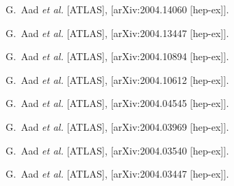\begin{thebibliography}{9}
G.~Aad \textit{et al.} [ATLAS],
[arXiv:2004.14060 [hep-ex]].

G.~Aad \textit{et al.} [ATLAS],
[arXiv:2004.13447 [hep-ex]].

G.~Aad \textit{et al.} [ATLAS],
[arXiv:2004.10894 [hep-ex]].

G.~Aad \textit{et al.} [ATLAS],
[arXiv:2004.10612 [hep-ex]].

G.~Aad \textit{et al.} [ATLAS],
[arXiv:2004.04545 [hep-ex]].

G.~Aad \textit{et al.} [ATLAS],
[arXiv:2004.03969 [hep-ex]].

G.~Aad \textit{et al.} [ATLAS],
[arXiv:2004.03540 [hep-ex]].

G.~Aad \textit{et al.} [ATLAS],
[arXiv:2004.03447 [hep-ex]].


\end{thebibliography}
